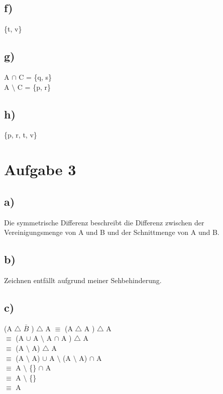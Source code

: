 \documentclass{article}
\begin{document}
	\subsection*{f)}
	\{t, v\}
	\subsection*{g)}
	A $\cap$ C = \{q, s\} \\ 
	A $\setminus$ C = \{p, r\}
	\subsection*{h)}
	\{p, r, t, v\}
	
	\section*{Aufgabe 3}
	\subsection*{a)}
	Die symmetrische Differenz beschreibt die Differenz zwischen der Vereinigungsmenge von A und B und der Schnittmenge von A und B. 
	\subsection*{b)}
	Zeichnen entfällt aufgrund meiner Sehbehinderung.
	\subsection*{c)}
	(A $\triangle$ $\bar{B}$ ) $\triangle$ A $\equiv$ (A $\triangle$ A ) $\triangle$ A \\
	$\equiv$ (A $\cup$ A $\setminus$ A $\cap$ A ) $\triangle$ A \\
	$\equiv$ (A $\setminus$ A) $\triangle$ A \\
	$\equiv$ (A $\setminus$ A) $\cup$ A $\setminus$ (A $\setminus$ A) $\cap$ A \\
	$\equiv$ A $\setminus$ \{\} $\cap$ A \\
	$\equiv$ A $\setminus$ \{\} \\
	$\equiv$ A
\end{document}
